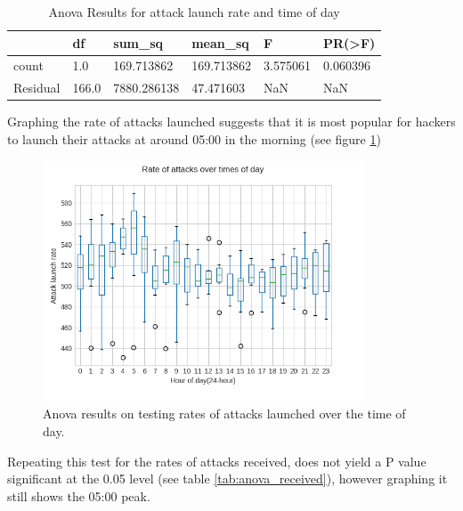     \begin{table}[H]
        \centering
        \begin{tabular}{|l|l|l|l|l|l|}
            \hline
                 & df    & sum\_sq     & mean\_sq   & F        & PR(\textgreater{}F) \\ \hline
        count    & 1.0   & 169.713862  & 169.713862 & 3.575061 & 0.060396            \\ \hline
        Residual & 166.0 & 7880.286138 & 47.471603  & NaN      & NaN \\\hline  
        \end{tabular}
        \caption{Anova Results for attack launch rate and time of day}
        \label{tab:anova_launches}
    \end{table}

    Graphing the rate of attacks launched suggests that 
    it is most popular for hackers to launch their attacks at
    around 05:00 in the morning (see figure \ref{fig:over_day})

    \begin{figure}[H]
        \centering
        \includegraphics[width=0.85\textwidth]{src/images/rate_over_day.png}
        \caption{Anova results on testing rates of attacks launched over the time of day.}
        \label{fig:over_day}
    \end{figure}

    Repeating this test for the rates of attacks received, 
    does not yield a P value significant at the 0.05 level (see 
    table \ref{tab:anova_received}),
    however graphing it still shows the 05:00 peak. 
    
